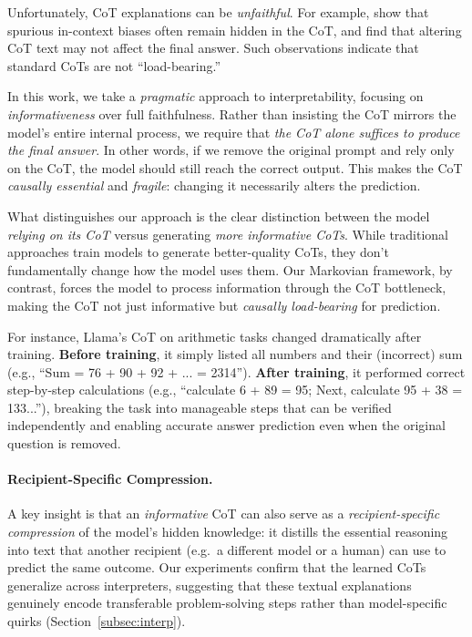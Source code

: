 \documentclass{article} %
\begin{document}
Unfortunately, CoT explanations can be \emph{unfaithful}. For example, \citet{turpin2023language} show that spurious in-context biases often remain hidden in the CoT, and \citet{lanham2023measuring} find that altering CoT text may not affect the final answer. Such observations indicate that standard CoTs are not ``load-bearing.''

In this work, we take a \emph{pragmatic} approach to interpretability, focusing on \emph{informativeness} over full faithfulness. Rather than insisting the CoT mirrors the model's entire internal process, we require that \emph{the CoT alone suffices to produce the final answer}. In other words, if we remove the original prompt and rely only on the CoT, the model should still reach the correct output. This makes the CoT \emph{causally essential} and \emph{fragile}: changing it necessarily alters the prediction.

What distinguishes our approach is the clear distinction between the model \emph{relying on its CoT} versus generating \emph{more informative CoTs}. While traditional approaches train models to generate better-quality CoTs, they don't fundamentally change how the model uses them. Our Markovian framework, by contrast, forces the model to process information through the CoT bottleneck, making the CoT not just informative but \emph{causally load-bearing} for prediction.

For instance, Llama's CoT on arithmetic tasks changed dramatically after training. \textbf{Before training}, it simply listed all numbers and their (incorrect) sum (e.g., ``Sum = 76 + 90 + 92 + ... = 2314''). \textbf{After training}, it performed correct step-by-step calculations (e.g., ``calculate 6 + 89 = 95; Next, calculate 95 + 38 = 133...''), breaking the task into manageable steps that can be verified independently and enabling accurate answer prediction even when the original question is removed.

\paragraph{Recipient-Specific Compression.}
A key insight is that an \emph{informative} CoT can also serve as a \emph{recipient-specific compression} of the model's hidden knowledge: it distills the essential reasoning into text that another recipient (e.g.\ a different model or a human) can use to predict the same outcome. Our experiments confirm that the learned CoTs generalize across interpreters, suggesting that these textual explanations genuinely encode transferable problem-solving steps rather than model-specific quirks (Section~\ref{subsec:interp}).
\end{document}
